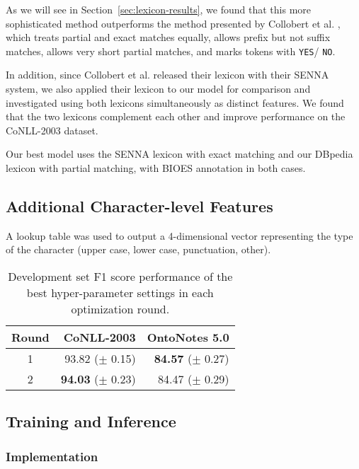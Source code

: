 \documentclass[11pt,letterpaper]{article}
\begin{document}
As we will see in Section~\ref{sec:lexicon-results}, we found that this more sophisticated method outperforms the method presented by Collobert et al. , which treats partial and exact matches equally, allows prefix but not suffix matches, allows very short partial matches, and marks tokens with {\tt YES}/{ \tt NO}.

In addition, since Collobert et al.  released their lexicon with their SENNA system, we also applied their lexicon to our model for comparison and investigated using both lexicons simultaneously as distinct features. We found that the two lexicons complement each other and improve performance on the CoNLL-2003 dataset.

Our best model uses the SENNA lexicon with exact matching and our DBpedia lexicon with partial matching, with BIOES annotation in both cases. 

\subsection{Additional Character-level Features}

\label{sec:char-types}
A lookup table was used to output a 4-dimensional vector representing the type of the character (upper case, lower case, punctuation, other).


\begin{table}[t]
\begin{center}
\small
\begin{tabular}{|c|r|r|}
\hline \bf Round & \bf CoNLL-2003 & \bf OntoNotes 5.0 \\ \hline
1 & 93.82 ($\pm$ 0.15) & {\bf 84.57} ($\pm$ 0.27) \\
2 & {\bf 94.03} ($\pm$ 0.23) & 84.47 ($\pm$ 0.29) \\
\hline
\end{tabular}
\end{center}
\caption{Development set F1 score performance of the best hyper-parameter settings in each optimization round.}
\label{tab:hyperopt-result}
\end{table}

\subsection{Training and Inference}

\subsubsection{Implementation}
\end{document}
